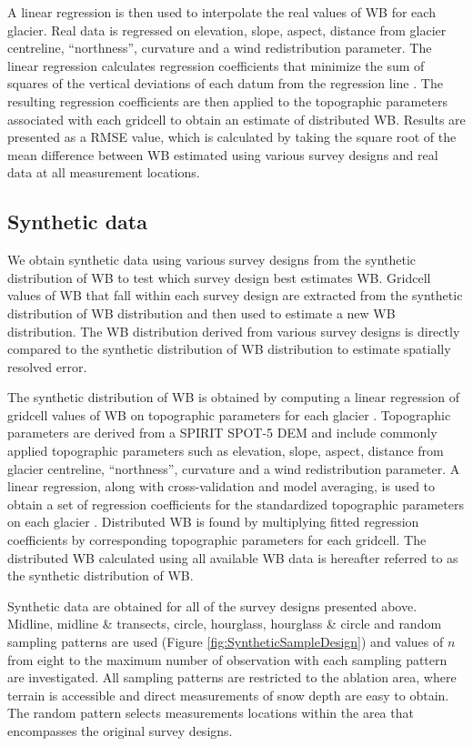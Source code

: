 \documentclass[twocolumn,letterpaper]{igs}
\begin{document}
A linear regression is then used to interpolate the real values of WB for each glacier. Real data is regressed on elevation, slope, aspect, distance from glacier centreline, ``northness'', curvature and a wind redistribution parameter. The linear regression calculates regression coefficients that minimize the sum of squares of the vertical deviations of each datum from the regression line \citep{Davis1986}. The resulting regression coefficients are then applied to the topographic parameters associated with each gridcell to obtain an estimate of distributed WB. Results are presented as a RMSE value, which is calculated by taking the square root of the mean difference between WB estimated using various survey designs and real data at all measurement locations.


\subsection{Synthetic data}

We obtain synthetic data using various survey designs from the synthetic distribution of WB to test which survey design best estimates WB. Gridcell values of WB that fall within each survey design are extracted from the synthetic distribution of WB distribution and then used to estimate a new WB distribution. The WB distribution derived from various survey designs is directly compared to the synthetic distribution of WB distribution to estimate spatially resolved error. 

The synthetic distribution of WB is obtained by computing a linear regression of gridcell values of WB on topographic parameters for each glacier \citep{Pulwicki2017}. Topographic parameters are derived from a SPIRIT SPOT-5 DEM \citep{Korona2009} and include commonly applied topographic parameters \citep[e.g.][]{McGrath2015} such as elevation, slope, aspect, distance from glacier centreline, ``northness'', curvature and a wind redistribution parameter. A linear regression, along with cross-validation and model averaging, is used to obtain a set of regression coefficients for the standardized topographic parameters on each glacier \citep{Pulwicki2017}. Distributed WB is found by multiplying fitted regression coefficients by corresponding topographic parameters for each gridcell. The distributed WB calculated using all available WB data is hereafter referred to as the synthetic distribution of WB.

Synthetic data are obtained for all of the survey designs presented above. Midline, midline \& transects, circle, hourglass, hourglass \& circle and random sampling patterns are used (Figure \ref{fig:SyntheticSampleDesign}) and values of $n$ from eight to the maximum number of observation with each sampling pattern are investigated. All sampling patterns are restricted to the ablation area, where terrain is accessible and direct measurements of snow depth are easy to obtain. The random pattern selects measurements locations within the area that encompasses the original survey designs.
\end{document}

